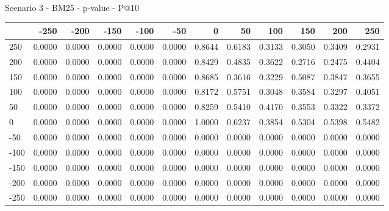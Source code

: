 Scenario 3 - BM25 - p-value - P@10
\begin{tabular}{lrrrrrrrrrrr}
\toprule
{} &   -250 &   -200 &   -150 &   -100 &   -50  &    0   &    50  &    100 &    150 &    200 &    250 \\
\midrule
 250 & 0.0000 & 0.0000 & 0.0000 & 0.0000 & 0.0000 & 0.8644 & 0.6183 & 0.3133 & 0.3050 & 0.3409 & 0.2931 \\
 200 & 0.0000 & 0.0000 & 0.0000 & 0.0000 & 0.0000 & 0.8429 & 0.4835 & 0.3622 & 0.2716 & 0.2475 & 0.4404 \\
 150 & 0.0000 & 0.0000 & 0.0000 & 0.0000 & 0.0000 & 0.8685 & 0.3616 & 0.3229 & 0.5087 & 0.3847 & 0.3655 \\
 100 & 0.0000 & 0.0000 & 0.0000 & 0.0000 & 0.0000 & 0.8172 & 0.5751 & 0.3048 & 0.3584 & 0.3297 & 0.4051 \\
 50  & 0.0000 & 0.0000 & 0.0000 & 0.0000 & 0.0000 & 0.8259 & 0.5410 & 0.4170 & 0.3553 & 0.3322 & 0.3372 \\
 0   & 0.0000 & 0.0000 & 0.0000 & 0.0000 & 0.0000 & 1.0000 & 0.6237 & 0.3854 & 0.5304 & 0.5398 & 0.5482 \\
-50  & 0.0000 & 0.0000 & 0.0000 & 0.0000 & 0.0000 & 0.0000 & 0.0000 & 0.0000 & 0.0000 & 0.0000 & 0.0000 \\
-100 & 0.0000 & 0.0000 & 0.0000 & 0.0000 & 0.0000 & 0.0000 & 0.0000 & 0.0000 & 0.0000 & 0.0000 & 0.0000 \\
-150 & 0.0000 & 0.0000 & 0.0000 & 0.0000 & 0.0000 & 0.0000 & 0.0000 & 0.0000 & 0.0000 & 0.0000 & 0.0000 \\
-200 & 0.0000 & 0.0000 & 0.0000 & 0.0000 & 0.0000 & 0.0000 & 0.0000 & 0.0000 & 0.0000 & 0.0000 & 0.0000 \\
-250 & 0.0000 & 0.0000 & 0.0000 & 0.0000 & 0.0000 & 0.0000 & 0.0000 & 0.0000 & 0.0000 & 0.0000 & 0.0000 \\
\bottomrule
\end{tabular}

